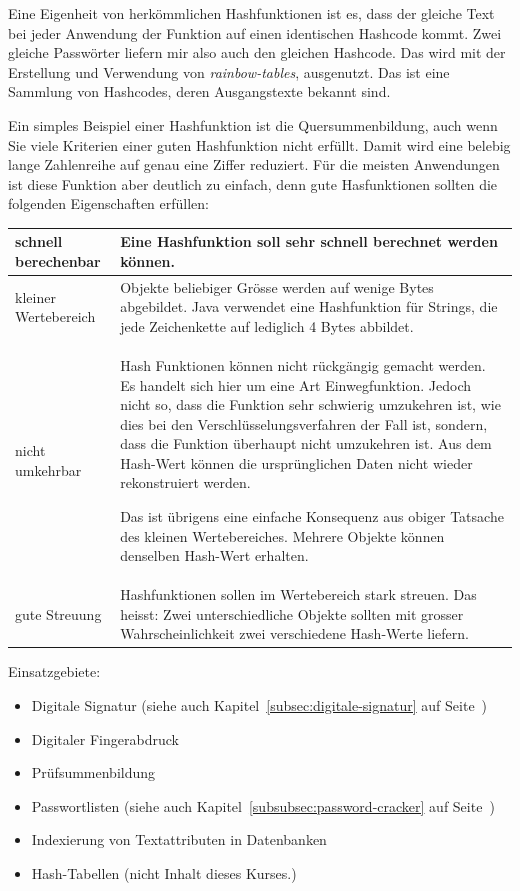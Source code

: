 Eine Eigenheit von herkömmlichen Hashfunktionen ist es, dass der
gleiche Text bei jeder Anwendung der Funktion auf einen identischen
Hashcode kommt. Zwei gleiche Passwörter liefern mir also auch den
gleichen Hashcode. Das wird mit der Erstellung und Verwendung von
\emph{rainbow-tables}, ausgenutzt. Das ist eine Sammlung von
Hashcodes, deren Ausgangstexte bekannt sind.

Ein simples Beispiel einer Hashfunktion ist die Quersummenbildung,
auch wenn Sie viele Kriterien einer guten Hashfunktion nicht
erfüllt. Damit wird eine belebig lange Zahlenreihe auf genau
eine Ziffer reduziert. Für die meisten Anwendungen ist diese
Funktion aber deutlich zu einfach, denn gute Hasfunktionen sollten
die folgenden Eigenschaften erfüllen:

\begin{tabular}{p{}|p{}}
    \hline
    schnell berechenbar &
    Eine Hashfunktion soll sehr schnell berechnet werden können. \\ \hline

    kleiner Wertebereich &
    Objekte beliebiger Grösse werden auf wenige Bytes abgebildet. Java
    verwendet eine Hashfunktion für Strings, die jede Zeichenkette
    auf lediglich 4 Bytes abbildet. \\ \hline

    nicht umkehrbar &
    Hash Funktionen können nicht rückgängig gemacht werden. Es handelt
    sich hier um eine Art Einwegfunktion. Jedoch nicht so, dass die
    Funktion sehr schwierig umzukehren ist, wie dies bei den
    Verschlüsselungsverfahren der Fall ist, sondern, dass die
    Funktion überhaupt nicht umzukehren ist. Aus dem Hash-Wert
    können die ursprünglichen Daten nicht wieder rekonstruiert werden.

    Das ist übrigens eine einfache Konsequenz aus obiger Tatsache
    des kleinen Wertebereiches. Mehrere Objekte können denselben
    Hash-Wert erhalten. \\ \hline

    gute Streuung &
    Hashfunktionen sollen im Wertebereich stark streuen. Das heisst:
    Zwei unterschiedliche Objekte sollten mit grosser Wahrscheinlichkeit
    zwei verschiedene Hash-Werte liefern. \\ \hline
\end{tabular}

Einsatzgebiete:
\begin{itemize}
    \item Digitale Signatur (siehe auch Kapitel~\ref{subsec:digitale-signatur}
    auf Seite~\pageref{subsec:digitale-signatur})
    \item Digitaler Fingerabdruck
    \item Prüfsummenbildung
    \item Passwortlisten (siehe auch Kapitel~\ref{subsubsec:password-cracker}
    auf Seite~\pageref{subsubsec:password-cracker})
    \item Indexierung von Textattributen in Datenbanken
    \item Hash-Tabellen (nicht Inhalt dieses Kurses.)
\end{itemize}


